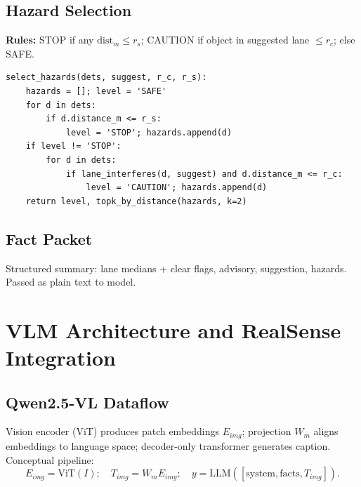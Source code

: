 \documentclass[11pt,a4paper]{article}
\newcommand{\dist}{\mathrm{dist}}
\begin{document}
\subsection{Hazard Selection}
\textbf{Rules:} STOP if any $\dist_m \le r_s$; CAUTION if object in suggested lane $\le r_c$; else SAFE.
\begin{lstlisting}[style=code]
select_hazards(dets, suggest, r_c, r_s):
    hazards = []; level = 'SAFE'
    for d in dets:
        if d.distance_m <= r_s:
            level = 'STOP'; hazards.append(d)
    if level != 'STOP':
        for d in dets:
            if lane_interferes(d, suggest) and d.distance_m <= r_c:
                level = 'CAUTION'; hazards.append(d)
    return level, topk_by_distance(hazards, k=2)
\end{lstlisting}

\subsection{Fact Packet}
Structured summary: lane medians + clear flags, advisory, suggestion, hazards. Passed as plain text to model.

\section{VLM Architecture and RealSense Integration}
\subsection{Qwen2.5-VL Dataflow}
Vision encoder (ViT) produces patch embeddings $E_{img}$; projection $W_m$ aligns embeddings to language space; decoder-only transformer generates caption. Conceptual pipeline:
\begin{equation}
E_{img} = \mathrm{ViT}(I);\quad T_{img} = W_m E_{img};\quad y = \mathrm{LLM}([\text{system}, \text{facts}, T_{img}]).
\end{equation}
\end{document}
